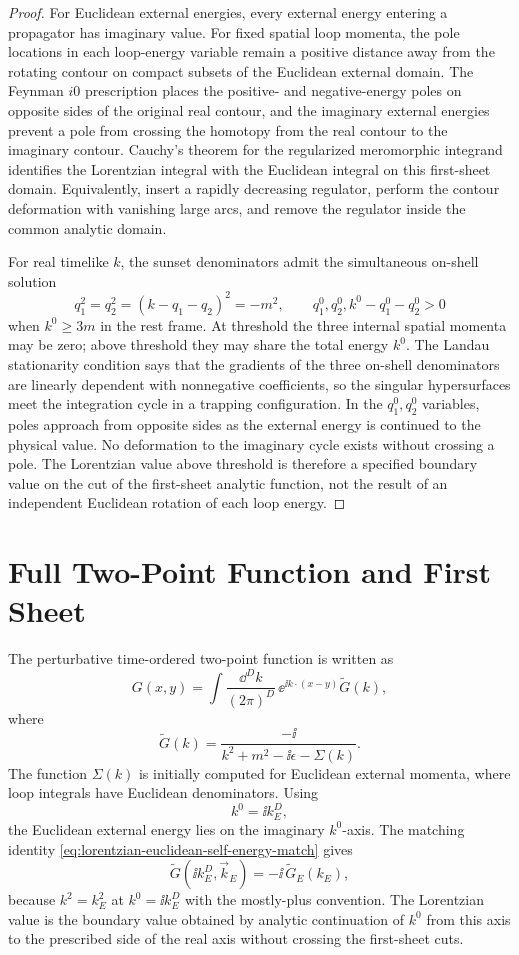 \begin{proof}
For Euclidean external energies, every external energy entering a propagator
has imaginary value.  For fixed spatial loop momenta, the pole locations in
each loop-energy variable remain a positive distance away from the rotating
contour on compact subsets of the Euclidean external domain.  The Feynman
\(i0\) prescription places the positive- and negative-energy poles on
opposite sides of the original real contour, and the imaginary external
energies prevent a pole from crossing the homotopy from the real contour to
the imaginary contour.  Cauchy's theorem for the regularized meromorphic
integrand identifies the Lorentzian integral with the Euclidean integral on
this first-sheet domain.  Equivalently, insert a rapidly decreasing
regulator, perform the contour deformation with vanishing large arcs, and
remove the regulator inside the common analytic domain.

For real timelike \(k\), the sunset denominators admit the simultaneous
on-shell solution
\[
  q_1^2=q_2^2=(k-q_1-q_2)^2=-m^2,
  \qquad
  q_1^0,q_2^0,k^0-q_1^0-q_2^0>0
\]
when \(k^0\ge3m\) in the rest frame.  At threshold the three internal spatial
momenta may be zero; above threshold they may share the total energy
\(k^0\).  The Landau stationarity condition says that the gradients of the
three on-shell denominators are linearly dependent with nonnegative
coefficients, so the singular hypersurfaces meet the integration cycle in a
trapping configuration.  In the \(q_1^0,q_2^0\) variables, poles
approach from opposite sides as the external energy is continued to the
physical value.  No deformation to the imaginary cycle exists without
crossing a pole.  The Lorentzian value above threshold is therefore a
specified boundary value on the cut of the first-sheet analytic function, not
the result of an independent Euclidean rotation of each loop energy.
\end{proof}

\section{Full Two-Point Function and First Sheet}

\begin{definition}
\label{def:first-sheet-two-point-continuation}
The perturbative time-ordered two-point function is written as
\[
  G(x,y)
  =
  \int\frac{\dd^D k}{(2\pi)^D}\,
  \ee^{\ii k\cdot(x-y)}
  \widetilde G(k),
\]
where
\[
  \widetilde G(k)
  =
  \frac{-\ii}{k^2+m^2-\ii\epsilon-\Sigma(k)} .
\]
The function \(\Sigma(k)\) is initially computed for Euclidean external
momenta, where loop integrals have Euclidean denominators. Using
\[
  k^0=\ii k_E^D ,
\]
the Euclidean external energy lies on the imaginary \(k^0\)-axis. The
matching identity \eqref{eq:lorentzian-euclidean-self-energy-match} gives
\[
  \widetilde G(\ii k_E^D,\vec k_E)
  =
  -\ii\,\widetilde G_E(k_E),
\]
because \(k^2=k_E^2\) at \(k^0=\ii k_E^D\) with the mostly-plus convention.
The Lorentzian value is the boundary value obtained by analytic continuation of
\(k^0\) from this axis to the prescribed side of the real axis without crossing
the first-sheet cuts.
\end{definition}


